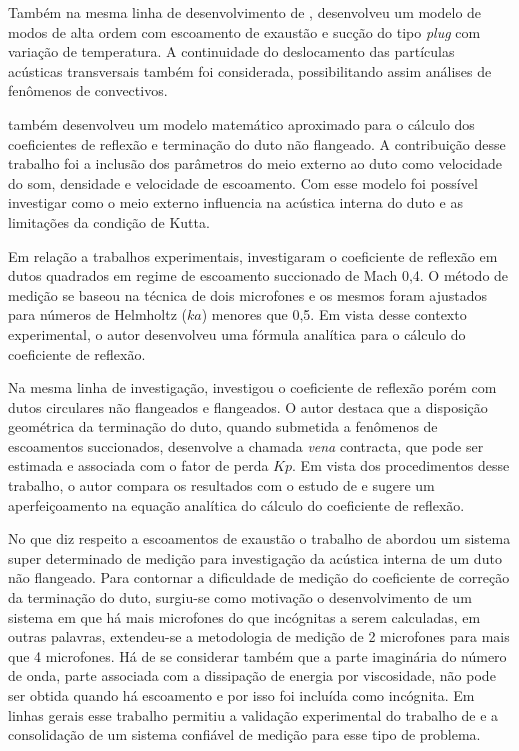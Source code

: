Também na mesma linha de desenvolvimento de ,  desenvolveu um modelo de modos de alta ordem com escoamento de exaustão e sucção do tipo \textit{plug} com variação de temperatura. A continuidade do deslocamento das partículas acústicas transversais também foi considerada, possibilitando assim análises de fenômenos de convectivos.

 também desenvolveu um modelo matemático aproximado para o cálculo dos coeficientes de reflexão e terminação do duto não flangeado. A contribuição desse trabalho foi a inclusão dos parâmetros do meio externo ao duto como velocidade do som, densidade e velocidade de escoamento. Com esse modelo foi possível investigar como o meio externo influencia na acústica interna do duto e as limitações da condição de Kutta.

Em relação a trabalhos experimentais,  investigaram o coeficiente de reflexão em dutos quadrados em regime de escoamento succionado de Mach 0,4. O método de medição se baseou na técnica de dois microfones e os mesmos foram ajustados para números de Helmholtz ($ka$) menores que 0,5. Em vista desse contexto experimental, o autor desenvolveu uma fórmula analítica para o cálculo do coeficiente de reflexão.

Na mesma linha de investigação,  investigou o coeficiente de reflexão porém com dutos circulares não flangeados e flangeados. O autor destaca que a disposição geométrica da terminação do duto, quando submetida a fenômenos de escoamentos succionados, desenvolve a chamada \textit{vena} contracta, que pode ser estimada e associada com o fator de perda $Kp$. Em vista dos procedimentos desse trabalho, o autor compara os resultados com o estudo de  e sugere um aperfeiçoamento na equação analítica do cálculo do coeficiente de reflexão.

No que diz respeito a escoamentos de exaustão o trabalho de  abordou um sistema super determinado de medição para investigação da acústica interna de um duto não flangeado. Para contornar a dificuldade de medição do coeficiente de correção da terminação do duto, surgiu-se como motivação o desenvolvimento de um sistema em que há mais microfones do que incógnitas a serem calculadas, em outras palavras, extendeu-se a metodologia de medição de 2 microfones para mais que 4 microfones. Há de se considerar também que a parte imaginária do número de onda, parte associada com a dissipação de energia por viscosidade, não pode ser obtida quando há escoamento e por isso foi incluída como incógnita. Em linhas gerais esse trabalho permitiu a validação experimental do trabalho de  e a consolidação de um sistema confiável de medição para esse tipo de problema.

